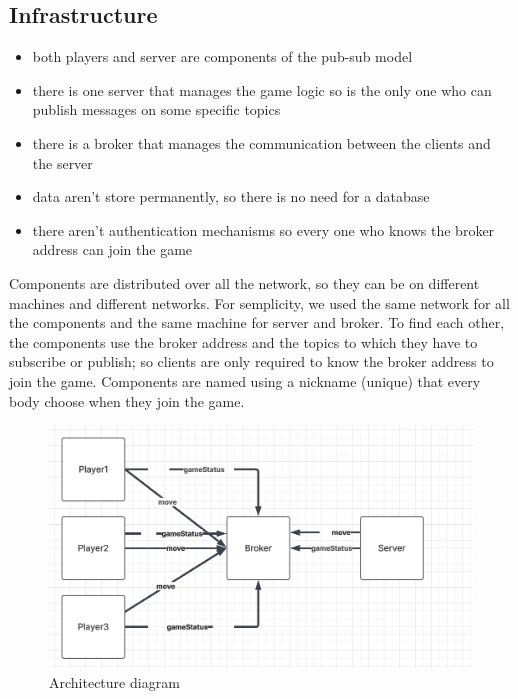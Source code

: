 \documentclass{scrartcl}
\begin{document}
\subsection{Infrastructure}\label{infrastructure}

  \begin{itemize}
    \item both players and server are components of the pub-sub model
    \item there is one server that manages the game logic so is the only one who can publish messages on some specific topics
    \item there is a broker that manages the communication between the clients and the server
    \item data aren't store permanently, so there is no need for a database 
    \item there aren't authentication mechanisms so every one who knows the broker address can join the game

  \end{itemize}
  Components are distributed over all the network, so they can be on different machines and different networks. For semplicity, we used the same network for all the components and the same machine for server and broker. \newline
  To find each other, the components use the broker address and the topics to which they have to subscribe or publish; so clients are only required to know the broker address to join the game. \newline
  Components are named using a nickname (unique) that every body choose when they join the game.


\begin{figure}[h]
  \caption{Architecture diagram}
  \centering
  \includegraphics[scale=0.5]{figures/pubsubdiagram.png}
  \end{figure}
\end{document}
